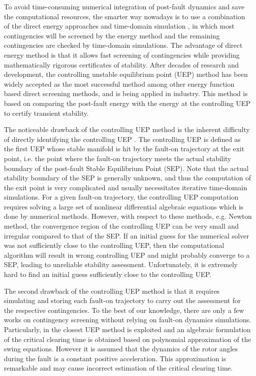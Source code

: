 \documentclass[final]{IEEEtran}
\begin{document}
To avoid time-consuming numerical integration of post-fault
dynamics and save the computational resources, the smarter way
nowadays is to use a combination of the direct energy approaches
and time-domain simulation
\cite{Pai:1981dv,chang1995direct,Chiang:2011eo}, in which most
contingencies will be screened by the energy method and the
remaining contingencies are checked by time-domain simulations.
The advantage of direct energy method is that it allows fast
screening of contingencies while providing mathematically rigorous
certificates of stability. After decades of research and
development, the controlling unstable equilibrium point (UEP)
method \cite{Chiang:1994ir} has been widely accepted as the most
successful method among other energy function based direct
screening methods, and is being applied in industry. This method
is based on comparing the post-fault energy with the energy at the
controlling UEP to certify transient stability.

The noticeable drawback of the controlling UEP method is the
inherent difficulty of directly identifying the controlling UEP
\cite{Chiang:2013}. The controlling UEP is defined as the first
UEP whose stable manifold is hit by the fault-on trajectory at the
exit point, i.e. the point where the fault-on trajectory meets the
actual stability boundary of the post-fault Stable Equilibrium
Point (SEP). Note that the actual stability boundary of the SEP is
generally unknown, and thus the computation of the exit point is
very complicated and usually necessitates iterative time-domain
simulations. For a given fault-on trajectory, the controlling UEP
computation requires solving a large set of nonlinear differential
algebraic equations which is done by numerical methods. However,
with respect to these methods, e.g. Newton method, the convergence
region of the controlling UEP can be very small and irregular
compared to that of the SEP. If an initial guess for the numerical
solver was not sufficiently close to the controlling UEP, then the
computational algorithm will result in wrong controlling UEP and
might probably converge to a SEP, leading to unreliable stability
assessment. Unfortunately, it is extremely hard to find an initial
guess sufficiently close to the controlling UEP.

The second drawback of the controlling UEP method is that it
requires simulating and storing each fault-on trajectory to carry
out the assessment for the respective contingencies. To the best
of our knowledge, there are only a few works on contingency
screening without relying on fault-on dynamics simulations.
Particularly, in \cite{roberts2015algebraic} the closest UEP
method is exploited and an algebraic formulation of the critical
clearing time is obtained based on polynomial approximation of the
swing equations. However it is assumed that the dynamics of the
rotor angles during  the  fault  is  a constant positive
acceleration. This approximation is remarkable and may cause
incorrect estimation of the critical clearing time.
\end{document}
